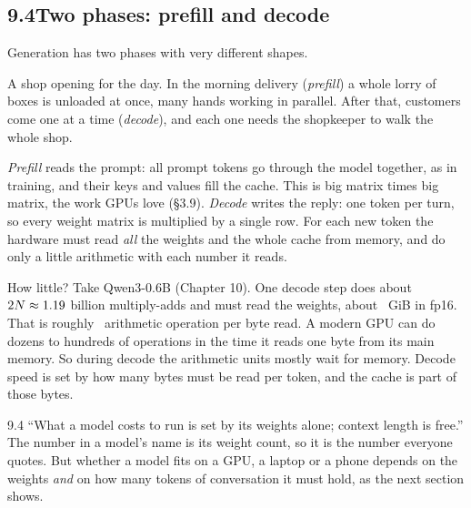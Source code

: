 
\subsection*{9.4\quad Two phases: prefill and decode}

Generation has two phases with very different shapes.

\Picture A shop opening for the day. In the morning delivery (\emph{prefill}) a whole lorry of boxes is
unloaded at once, many hands working in parallel. After that, customers come one at a time
(\emph{decode}), and each one needs the shopkeeper to walk the whole shop.

\Exactly \emph{Prefill} reads the prompt: all prompt tokens go through the model together, as in training,
and their keys and values fill the cache. This is big matrix times big matrix, the work GPUs love
(\S3.9). \emph{Decode} writes the reply: one token per turn, so every weight matrix is multiplied by a
single row. For each new token the hardware must read \emph{all} the weights and the whole cache from
memory, and do only a little arithmetic with each number it reads.

How little? Take Qwen3-0.6B (Chapter 10). One decode step does about $2N \approx 1.19$
billion multiply-adds and must read the weights, about \nNineQwenWeightsGiB\ GiB in fp16. That is roughly
\nNineQwenDecodeIntensity\ arithmetic operation per byte read. A modern GPU can do dozens to hundreds of
operations in the time it reads one byte from its main memory. So during decode the arithmetic units mostly
wait for memory. Decode speed is set by how many bytes must be read per token, and the cache is part of
those bytes.

\begin{wrongidea}{9.4}
``What a model costs to run is set by its weights alone; context length is free.'' The number in a model's name
is its weight count, so it is the number everyone quotes. But whether a model fits on a GPU, a laptop
or a phone depends on the weights \emph{and} on how many tokens of conversation it must hold, as the next
section shows.
\end{wrongidea}


